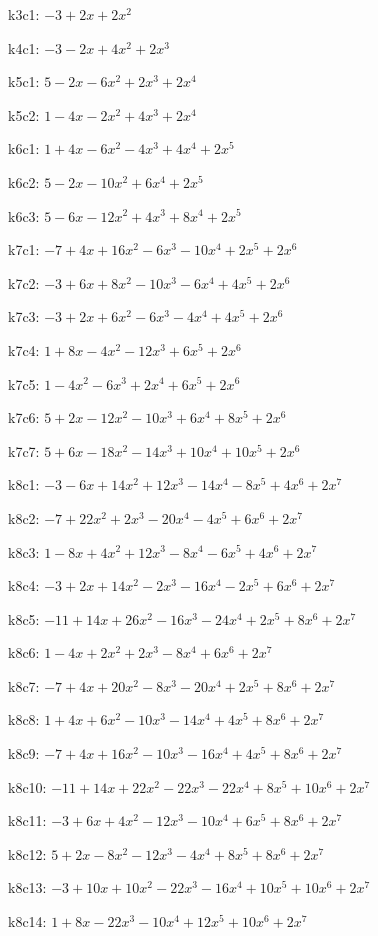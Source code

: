 k3c1: $ -3+2x+2x^{2} $ 

k4c1: $ -3-2x+4x^{2}+2x^{3} $ 

k5c1: $ 5-2x-6x^{2}+2x^{3}+2x^{4} $ 

k5c2: $ 1-4x-2x^{2}+4x^{3}+2x^{4} $ 

k6c1: $ 1+4x-6x^{2}-4x^{3}+4x^{4}+2x^{5} $ 

k6c2: $ 5-2x-10x^{2}+6x^{4}+2x^{5} $ 

k6c3: $ 5-6x-12x^{2}+4x^{3}+8x^{4}+2x^{5} $ 

k7c1: $ -7+4x+16x^{2}-6x^{3}-10x^{4}+2x^{5}+2x^{6} $ 

k7c2: $ -3+6x+8x^{2}-10x^{3}-6x^{4}+4x^{5}+2x^{6} $ 

k7c3: $ -3+2x+6x^{2}-6x^{3}-4x^{4}+4x^{5}+2x^{6} $ 

k7c4: $ 1+8x-4x^{2}-12x^{3}+6x^{5}+2x^{6} $ 

k7c5: $ 1-4x^{2}-6x^{3}+2x^{4}+6x^{5}+2x^{6} $ 

k7c6: $ 5+2x-12x^{2}-10x^{3}+6x^{4}+8x^{5}+2x^{6} $ 

k7c7: $ 5+6x-18x^{2}-14x^{3}+10x^{4}+10x^{5}+2x^{6} $ 

k8c1: $ -3-6x+14x^{2}+12x^{3}-14x^{4}-8x^{5}+4x^{6}+2x^{7} $ 

k8c2: $ -7+22x^{2}+2x^{3}-20x^{4}-4x^{5}+6x^{6}+2x^{7} $ 

k8c3: $ 1-8x+4x^{2}+12x^{3}-8x^{4}-6x^{5}+4x^{6}+2x^{7} $ 

k8c4: $ -3+2x+14x^{2}-2x^{3}-16x^{4}-2x^{5}+6x^{6}+2x^{7} $ 

k8c5: $ -11+14x+26x^{2}-16x^{3}-24x^{4}+2x^{5}+8x^{6}+2x^{7} $ 

k8c6: $ 1-4x+2x^{2}+2x^{3}-8x^{4}+6x^{6}+2x^{7} $ 

k8c7: $ -7+4x+20x^{2}-8x^{3}-20x^{4}+2x^{5}+8x^{6}+2x^{7} $ 

k8c8: $ 1+4x+6x^{2}-10x^{3}-14x^{4}+4x^{5}+8x^{6}+2x^{7} $ 

k8c9: $ -7+4x+16x^{2}-10x^{3}-16x^{4}+4x^{5}+8x^{6}+2x^{7} $ 

k8c10: $ -11+14x+22x^{2}-22x^{3}-22x^{4}+8x^{5}+10x^{6}+2x^{7} $ 

k8c11: $ -3+6x+4x^{2}-12x^{3}-10x^{4}+6x^{5}+8x^{6}+2x^{7} $ 

k8c12: $ 5+2x-8x^{2}-12x^{3}-4x^{4}+8x^{5}+8x^{6}+2x^{7} $ 

k8c13: $ -3+10x+10x^{2}-22x^{3}-16x^{4}+10x^{5}+10x^{6}+2x^{7} $ 

k8c14: $ 1+8x-22x^{3}-10x^{4}+12x^{5}+10x^{6}+2x^{7} $ 

